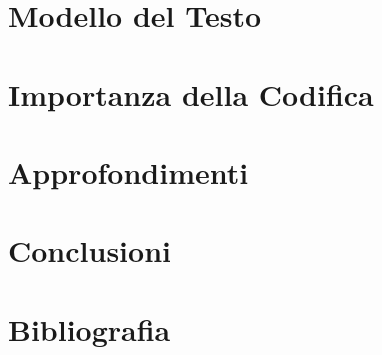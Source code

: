 \documentclass{beamer}
\begin{document}
\section{Modello del Testo}
%

\section{Importanza della Codifica}
%

\section{Approfondimenti}
%

\section{Conclusioni}
%

\section{Bibliografia}
%
\end{document}
